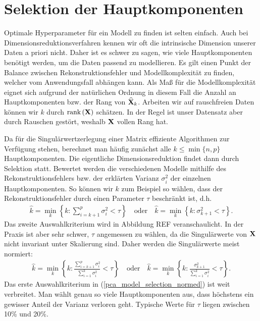 

\section{Selektion der Hauptkomponenten}
\label{selection_principal_components}

Optimale Hyperparameter für ein Modell zu finden ist selten einfach. Auch bei Dimensionsreduktionsverfahren kennen wir oft die intrinsische Dimension unserer Daten a priori nicht. Daher ist es schwer zu sagen, wie viele Hauptkomponenten benötigt werden, um die Daten passend zu modellieren. Es gilt einen Punkt der Balance zwischen Rekonstruktionsfehler und Modellkomplexität zu finden, welcher vom Anwendungsfall abhängen kann. Als Maß für die Modellkomplexität eignet sich aufgrund der natürlichen Ordnung in diesem Fall die Anzahl an Hauptkomponenten bzw. der Rang von $\widehat{\mathbf{X}}_k$. Arbeiten wir auf rauschfreien Daten können wir $k$ durch $\text{rank} \left( \mathbf{X} \right)$ schätzen. In der Regel ist unser Datensatz aber durch Rauschen gestört, weshalb $\mathbf{X}$ vollen Rang hat.

Da für die Singulärwertzerlegung einer Matrix effiziente Algorithmen zur Verfügung stehen, berechnet man häufig zunächst alle $k \leq \min\{n, p\}$ Hauptkomponenten. Die eigentliche Dimensionsreduktion findet dann durch Selektion statt. Bewertet werden die verschiedenen Modelle mithilfe des Rekonstruktionsfehlers bzw. der erklärten Varianz $\sigma_i^2$ der einzelnen Hauptkomponenten. So können wir $k$ zum Beispiel so wählen, dass der Rekonstruktionsfehler durch einen Parameter $\tau$ beschränkt ist, d.h.
\begin{align}
\label{pca_model_selection}
\widehat{k} = \min_k \left\{k \colon \sum_{i = k+1}^{p} \sigma_i^2 < \tau \right\} \quad \text{oder} \quad \widehat{k} = \min_k \left\{k \colon \sigma_{k+1}^2 < \tau \right\}.
\end{align}
Das zweite Auswahlkriterium wird in Abbildung REF veranschaulicht.
In der Praxis ist aber sehr schwer, $\tau$ angemessen zu wählen, da die Singulärwerte von $\mathbf{X}$ nicht invariant unter Skalierung sind. Daher werden die Singulärwerte meist normiert:
\begin{align}
\label{pca_model_selection_normed}
\widehat{k} = \min_k \left\{k \colon \frac{\sum_{i = k+1}^{p} \sigma_i^2}{\sum_{i=1}^k \sigma_i^2} < \tau \right\} \quad \text{oder} \quad \widehat{k} = \min_k \left\{k \colon \frac{\sigma_{k+1}^2}{\sum_{i=1}^k \sigma_i^2} < \tau \right\}.
\end{align}
Das erste Auswahlkriterium in (\ref{pca_model_selection_normed}) ist weit verbreitet. Man wählt genau so viele Hauptkomponenten aus, dass höchstens ein gewisser Anteil der Varianz verloren geht. Typische Werte für $\tau$ liegen zwischen 10\% und 20\%. 

